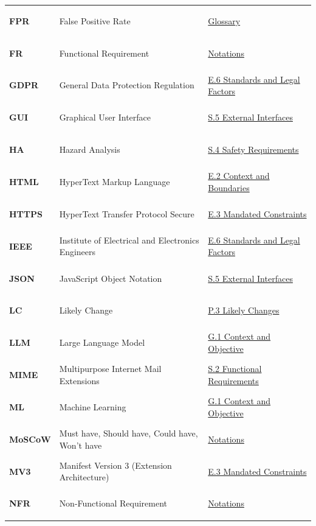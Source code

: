 \documentclass[11pt]{article}
\begin{document}
{\begin{tabularx}{\textwidth}{l P{6.0cm} Y}
\hypertarget{acr-fpr}{\textbf{FPR}} & False Positive Rate & \hyperref[subsec:glossary]{Glossary}\\
\hypertarget{acr-fr}{\textbf{FR}} & Functional Requirement & \hyperref[subsec:conventions]{Notations}\\
\hypertarget{acr-gdpr}{\textbf{GDPR}} & General Data Protection Regulation & \hyperref[subsec:standards-legal]{E.6 Standards and Legal Factors}\\
\hypertarget{acr-gui}{\textbf{GUI}} & Graphical User Interface & \hyperref[subsec:interfaces]{S.5 External Interfaces}\\
\hypertarget{acr-ha}{\textbf{HA}} & Hazard Analysis & \hyperref[subsec:safety-reqs]{S.4 Safety Requirements}\\
\hypertarget{acr-html}{\textbf{HTML}} & HyperText Markup Language & \hyperref[subsec:env-components]{E.2 Context and Boundaries}\\
\hypertarget{acr-https}{\textbf{HTTPS}} & HyperText Transfer Protocol Secure & \hyperref[subsec:constraints]{E.3 Mandated Constraints}\\
\hypertarget{acr-ieee}{\textbf{IEEE}} & Institute of Electrical and Electronics Engineers & \hyperref[subsec:standards-legal]{E.6 Standards and Legal Factors}\\
\hypertarget{acr-json}{\textbf{JSON}} & JavaScript Object Notation & \hyperref[subsec:interfaces]{S.5 External Interfaces}\\
\hypertarget{acr-lc}{\textbf{LC}} & Likely Change & \hyperref[subsec:likely-changes]{P.3 Likely Changes}\\
\hypertarget{acr-llm}{\textbf{LLM}} & Large Language Model & \hyperref[subsec:context-objective]{G.1 Context and Objective}\\
\hypertarget{acr-mime}{\textbf{MIME}} & Multipurpose Internet Mail Extensions & \hyperref[subsec:func-reqs]{S.2 Functional Requirements}\\
\hypertarget{acr-ml}{\textbf{ML}} & Machine Learning & \hyperref[subsec:context-objective]{G.1 Context and Objective}\\
\hypertarget{acr-moscow}{\textbf{MoSCoW}} & Must have, Should have, Could have, Won't have & \hyperref[subsec:conventions]{Notations}\\
\hypertarget{acr-mv3}{\textbf{MV3}} & Manifest Version 3 (Extension Architecture) & \hyperref[subsec:constraints]{E.3 Mandated Constraints}\\
\hypertarget{acr-nfr}{\textbf{NFR}} & Non-Functional Requirement & \hyperref[subsec:conventions]{Notations}\\

\end{tabularx}}
\end{document}
